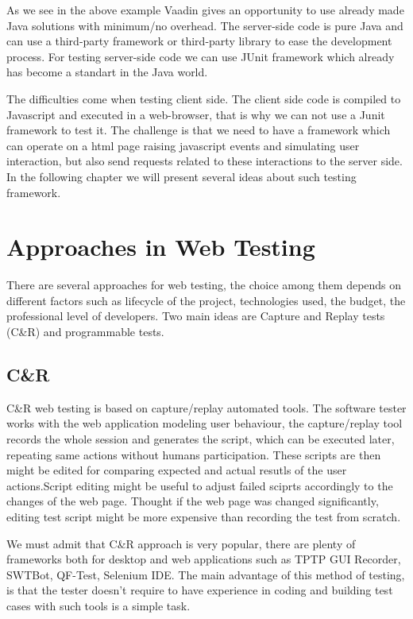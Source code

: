 \documentclass{article}
\begin{document}
	  As we see in the above example Vaadin gives an opportunity to use already
	  made Java solutions with minimum/no overhead. The server-side code is pure
	  Java and can use a third-party framework or third-party library to ease the
	  development process. For testing server-side code we can use JUnit framework
	  which already has become a standart in the Java world.
	  
	  The difficulties come when testing client side. The client side code is
	  compiled to Javascript and executed in a web-browser, that is why we can not
	  use a Junit framework to test it. The challenge is that we need to have a
	  framework which can operate on a html page raising javascript events and
	  simulating user interaction, but also send requests related to these
	  interactions to the server side. In the following chapter we will
	  present several ideas about such testing framework.	   
	\section {Approaches in Web Testing}
		There are several approaches for web testing, the choice among them depends on
		different factors such as lifecycle of the project, technologies used, the
		budget, the professional level of developers. Two main ideas are Capture and
		Replay tests (C\&R) and programmable tests.
		
		\subsection{C\&R}
			C\&R web testing is based on capture/replay automated
			tools. \cite{CaptureReplay7} The software tester works with the web
			application modeling user behaviour, the capture/replay tool records the
			whole session and generates the script, which can be executed later,
			repeating same actions without humans participation. These scripts are then
			might be edited for comparing expected and actual resutls of the user
			actions.Script editing might be useful to adjust failed sciprts accordingly
			to the changes of the web page. Thought if the web page was changed
			significantly, editing test script might be more expensive than recording the
			test from scratch. 
			
			We must admit that C\&R approach is very popular, there are plenty of
			frameworks both for desktop and web applications such as TPTP GUI Recorder, SWTBot, QF-Test,
			Selenium IDE.
			The main advantage of this method of testing, is that the tester doesn't
			require to have experience in coding and building test cases with such tools is a simple task. 
			
\end{document}
